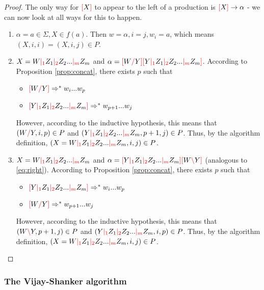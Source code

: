 \documentclass[main.tex]{subfiles}
\begin{document}
\begin{proof}
    The only way for $\textcolor{red}{[} X \textcolor{red}{]}$ to appear to the left
    of a production is $\textcolor{red}{[} X \textcolor{red}{]} \rightarrow \alpha$ - we can now look at
    all ways for this to happen.
    \begin{enumerate}
        \item $\alpha = a \in \Sigma, X \in f(a)$. Then $w = \alpha, i = j, w_i = a$,
            which means $(X, i, i) = (X, i, j) \in P$.
        \item $X = W \textcolor{red}{|_{1}} Z_1 \textcolor{red}{|_{2}} Z_2 ... \textcolor{red}{|_{m}} Z_m$ and
            $\alpha = \textcolor{red}{[} W \textcolor{red}{/} Y \textcolor{red}{]} \textcolor{red}{[} Y \textcolor{red}{|_{1}} Z_1 \textcolor{red}{|_{2}} Z_2 ... \textcolor{red}{|_{m}} Z_m \textcolor{red}{]}$.
            According to Proposition \ref{prop:concat}, there exists $p$ such that
            \begin{itemize}
                \item $\textcolor{red}{[} W \textcolor{red}{/} Y \textcolor{red}{]} \Rightarrow^* w_i ... w_p$
                \item $\textcolor{red}{[} Y \textcolor{red}{|_{1}} Z_1 \textcolor{red}{|_{2}} Z_2 ... \textcolor{red}{|_{m}} Z_m \textcolor{red}{]} \Rightarrow^* w_{p+1} ... w_j$
            \end{itemize}
            However, according to the inductive hypothesis, this means that
            $(W \textcolor{red}{/} Y, i, p) \in P$ and
            $(Y \textcolor{red}{|_{1}} Z_1 \textcolor{red}{|_{2}} Z_2 ... \textcolor{red}{|_{m}} Z_m, p + 1, j) \in P$. Thus,
            by the algorithm definition,
            $(X = W \textcolor{red}{|_{1}} Z_1 \textcolor{red}{|_{2}} Z_2 ... \textcolor{red}{|_{m}} Z_m, i, j) \in P$.
        \item $X = W \textcolor{red}{|_{1}} Z_1 \textcolor{red}{|_{2}} Z_2 ... \textcolor{red}{|_{m}} Z_m$ and
            $\alpha = \textcolor{red}{[} Y \textcolor{red}{|_{1}} Z_1 \textcolor{red}{|_{2}} Z_2 ... \textcolor{red}{|_{m}} Z_m \textcolor{red}{]} \textcolor{red}{[} W \textcolor{red}{\backslash} Y \textcolor{red}{]}$
            (analogous to \ref{eq:right}).
            According to Proposition \ref{prop:concat}, there exists $p$ such that
            \begin{itemize}
                \item $\textcolor{red}{[} Y \textcolor{red}{|_{1}} Z_1 \textcolor{red}{|_{2}} Z_2 ... \textcolor{red}{|_{m}} Z_m \textcolor{red}{]} \Rightarrow^* w_i ... w_p$
                \item $\textcolor{red}{[} W \textcolor{red}{/} Y \textcolor{red}{]} \Rightarrow^* w_{p + 1} ... w_j$
            \end{itemize}
            However, according to the inductive hypothesis, this means that
            $(W \textcolor{red}{\backslash} Y, p + 1, j) \in P$ and
            $(Y \textcolor{red}{|_{1}} Z_1 \textcolor{red}{|_{2}} Z_2 ... \textcolor{red}{|_{m}} Z_m, i, p) \in P$. Thus,
            by the algorithm definition,
            $(X = W \textcolor{red}{|_{1}} Z_1 \textcolor{red}{|_{2}} Z_2 ... \textcolor{red}{|_{m}} Z_m, i, j) \in P$.
    \end{enumerate}

\end{proof}

\subsubsection{The Vijay-Shanker algorithm}
\end{document}
